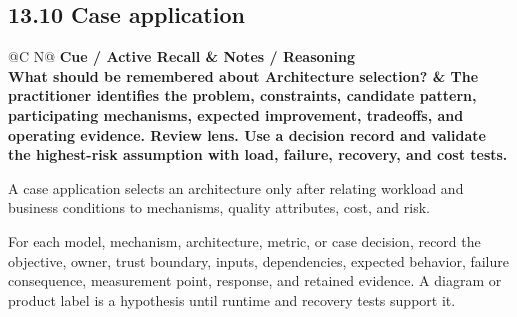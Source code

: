 \documentclass[11pt]{article}
\newcommand{\CornellHeader}{\rowcolor{Navy}\color{white}\bfseries Cue / Active Recall & \color{white}\bfseries Notes / Reasoning \\\endhead}
\newcommand{\CornellRow}[2]{\cellcolor{CueGray}\textbf{#1} & #2 \\\addlinespace[3pt]}
\begin{document}
\subsection{13.10 Case application}
\begin{longtable}{@{}C N@{}}
\CornellHeader
\CornellRow{What should be remembered about Architecture selection?}{The practitioner identifies the problem, constraints, candidate pattern, participating mechanisms, expected improvement, tradeoffs, and operating evidence. \textbf{Review lens.} Use a decision record and validate the highest-risk assumption with load, failure, recovery, and cost tests.}
\end{longtable}
\begin{sectionsummarybox}
A case application selects an architecture only after relating workload and business conditions to mechanisms, quality attributes, cost, and risk.
\end{sectionsummarybox}
\begin{practicebox}
For each model, mechanism, architecture, metric, or case decision, record the objective, owner, trust boundary, inputs, dependencies, expected behavior, failure consequence, measurement point, response, and retained evidence. A diagram or product label is a hypothesis until runtime and recovery tests support it.
\end{practicebox}
\end{document}
